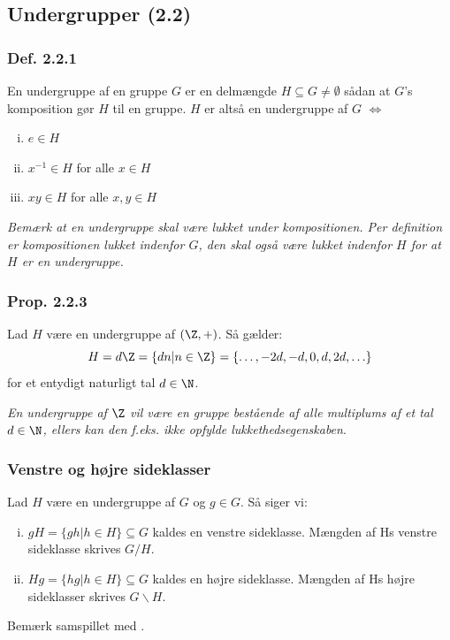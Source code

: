\subsection{Undergrupper (2.2)}
\subsubsection{Def. 2.2.1}
En undergruppe af en gruppe $G$ er en delmængde $H \subseteq G \neq \emptyset$
sådan at $G$'s komposition gør $H$ til en gruppe. $H$ er altså en undergruppe af $G$
$\iff$
\begin{enumerate}[(i)]
  \item $e \in H$
  \item $x^{-1} \in H$ for alle $x \in H$
  \item $xy \in H$ for alle $x, y \in H$
\end{enumerate}
\textit{Bemærk at en undergruppe skal være lukket under kompositionen. Per
definition er kompositionen lukket indenfor $G$, den skal også være lukket
indenfor $H$ for at $H$ er en undergruppe.}

\subsubsection{Prop. 2.2.3}
\label{2.2.3}
Lad $H$ være en undergruppe af $(\Z, +)$. Så gælder:
\begin{equation*}
  H = d\Z = \{ dn | n \in \Z \} = \{ \ldots, -2d, -d, 0, d, 2d, \ldots \}
\end{equation*}
for et entydigt naturligt tal $d\in \N$.

\textit{En undergruppe af $\Z$ vil være en gruppe bestående af alle multiplums
af et tal $d \in \N$, ellers kan den f.eks. ikke opfylde lukkethedsegenskaben}.

\subsubsection{Venstre og højre sideklasser}
\label{sideklasser}
Lad $H$ være en undergruppe af $G$ og $g \in G$. Så siger vi:
\begin{enumerate}[(i)]
  \item $gH = \{gh | h \in H\} \subseteq G$ kaldes en venstre sideklasse.
  Mængden af Hs venstre sideklasse skrives $G\slash H$.
  \item $Hg = \{hg | h \in H\} \subseteq G$ kaldes en højre sideklasse. Mængden
  af Hs højre sideklasser skrives $G\backslash H$.
\end{enumerate}
Bemærk samspillet med .

